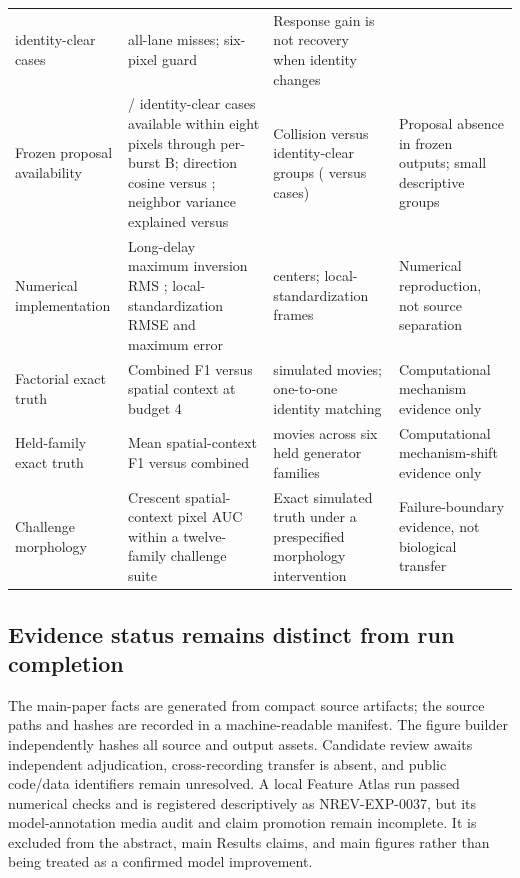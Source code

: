\begin{table}[!htbp]
\begin{tabularx}{\textwidth}{>{\raggedright\arraybackslash}p{}
  >{\raggedright\arraybackslash}p{}
  >{\raggedright\arraybackslash}p{}
  >{\raggedright\arraybackslash}X}
\VenueIdentityClear{} identity-clear cases & \VenueStrictMissed{} all-lane
misses; six-pixel guard & Response gain is not recovery when identity changes \\
Frozen proposal availability & 0/\VenueIdentityClear{} identity-clear cases
available within eight pixels through per-burst B\VenueCounterfactualBudget{};
direction cosine \VenueCollisionDirectionCosine{} versus
\VenueClearDirectionCosine{}; neighbor variance explained
\VenueCollisionNeighborRtwo{} versus \VenueClearNeighborRtwo{} & Collision
versus identity-clear groups (\VenueIdentityCollision{} versus
\VenueIdentityClear{} cases) & Proposal
absence in frozen outputs; small descriptive groups \\
Numerical implementation & Long-delay maximum inversion RMS
\VenueLongDelayInversionRMSText{}; local-standardization RMSE
\VenueLSRMSEText{} and maximum error \VenueLSMaxErrorText{} &
\VenueCohortSites{} centers;
\VenueAuditFrames{} local-standardization frames & Numerical reproduction, not
source separation \\
Factorial exact truth & Combined F1 \VenueMovieCombinedFone{} versus spatial
context \VenueMovieSpatialFone{} at budget 4 & \VenueMovieBenchmarkCount{}
simulated movies; one-to-one identity matching & Computational mechanism
evidence only \\
Held-family exact truth & Mean spatial-context F1 \VenueFamilySpatialFone{}
versus combined \VenueFamilyCombinedFone{} & \VenueFamilyHoldoutCount{} movies
across six held generator families & Computational mechanism-shift evidence
only \\
Challenge morphology & Crescent spatial-context pixel AUC \VenueCrescentAUC{}
within a twelve-family challenge suite & Exact simulated truth under a
prespecified morphology intervention & Failure-boundary evidence, not
biological transfer \\
\bottomrule
\end{tabularx}
\end{table}

\subsection{Evidence status remains distinct from run completion}

The main-paper facts are generated from \VenueFactSourceCount{} compact source
artifacts; the
source paths and hashes are recorded in a machine-readable manifest. The figure
builder independently hashes all source and output assets. Candidate review
awaits independent adjudication, cross-recording transfer is absent, and public
code/data identifiers remain unresolved. A local Feature Atlas run passed
numerical checks and is registered descriptively as NREV-EXP-0037, but its
model-annotation media audit and claim promotion remain incomplete. It is excluded from the
abstract, main Results claims, and main figures rather than being treated as a
confirmed model improvement.

